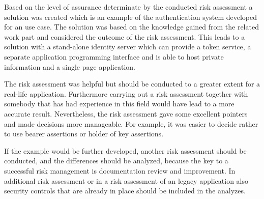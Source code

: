 Based on the level of assurance determinate by the conducted risk assessment a solution was created which is an example of the authentication system developed for an use case. The solution was based on the knowledge gained from the related work part and considered the outcome of the risk assessment. This leads to a solution with a stand-alone identity server which can provide a token service, a separate application programming interface and is able to host private information and a single page application. 

The risk assessment was helpful but should be conducted to a greater extent for a real-life application. Furthermore carrying out a risk assessment together with somebody that has had experience in this field would have lead to a more accurate result. Nevertheless, the risk assessment gave some excellent pointers and made decisions more manageable. For example, it was easier to decide rather to use bearer assertions or holder of key assertions. 

If the example would be further developed, another risk assessment should be conducted, and the differences should be analyzed, because the key to a successful risk management is documentation review and improvement. In additional risk assessment or in a risk assessment of an legacy application also security controls that are already in place should be included in the analyzes. 

\chapterend
